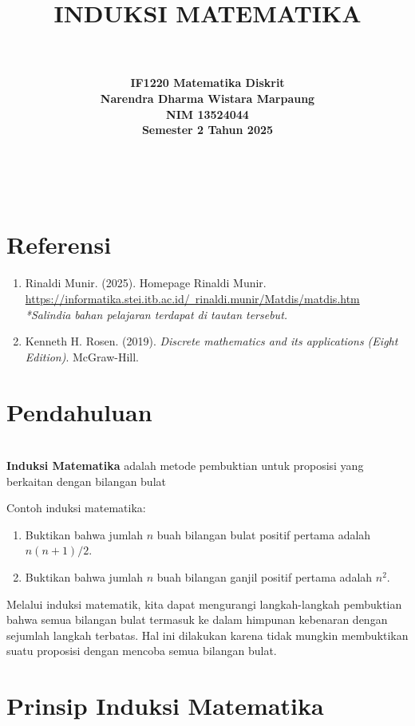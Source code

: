 \documentclass[11pt]{article}
\title {
    \Huge{\bfseries{INDUKSI MATEMATIKA}} \\
}
\author {
    \rule{12.5cm}{0.5pt} \\[3pt]
    \bfseries{IF1220 Matematika Diskrit}\\[3pt]
    Narendra Dharma Wistara Marpaung \\[3pt]
    NIM 13524044 \\[3pt]
    Semester 2 Tahun 2025 \\[3pt]
    \rule{12.5cm}{0.5pt} \\[1.5pt]
}
\date{}
\theoremstyle{definitionstyle}
\theoremstyle{theoremstyle}
\theoremstyle{examplestyle}
\begin{document}
\maketitle
\thispagestyle{empty}
\tableofcontents
\section*{Referensi}
\begin{enumerate}[left=0pt, itemsep=1.5pt, topsep=1.5pt]
    \item Rinaldi Munir. (2025). Homepage Rinaldi Munir. \href{https://informatika.stei.itb.ac.id/~rinaldi.munir/Matdis/matdis.htm}{https://informatika.stei.itb.ac.id/~rinaldi.munir/Matdis/matdis.htm} \\
    \textit{*Salindia bahan pelajaran terdapat di tautan tersebut.}
    \item Kenneth H. Rosen. (2019). \textit{Discrete mathematics and its applications (Eight Edition)}. McGraw-Hill.
\end{enumerate}

\pagebreak

\setcounter{page}{1}
\section{Pendahuluan}

\begin{definition} \hfill \\
    \textbf{Induksi Matematika} adalah metode pembuktian untuk proposisi yang berkaitan dengan bilangan bulat
\end{definition}

\noindent Contoh induksi matematika:
\begin{enumerate}[left=0pt, itemsep=1.5pt, topsep=1.5pt]
    \item Buktikan bahwa jumlah $n$ buah bilangan bulat positif pertama adalah $n(n + 1)/2$.
    \item Buktikan bahwa jumlah $n$ buah bilangan ganjil positif pertama adalah $n^2$.
\end{enumerate}

Melalui induksi matematik, kita dapat mengurangi langkah-langkah pembuktian bahwa semua bilangan bulat termasuk ke dalam himpunan kebenaran dengan sejumlah langkah terbatas. Hal ini dilakukan karena tidak mungkin membuktikan suatu proposisi dengan mencoba semua bilangan bulat.

\section{Prinsip Induksi Matematika}
\end{document}
